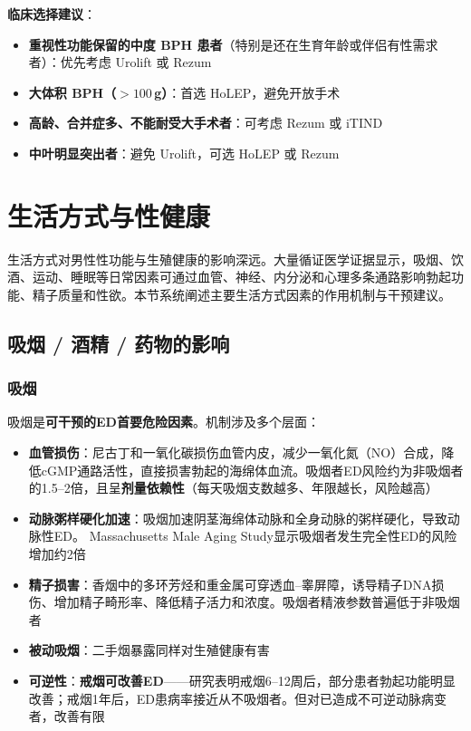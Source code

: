 \noindent\textbf{临床选择建议}：
\begin{itemize}[leftmargin=2cm]
	\item \textbf{重视性功能保留的中度 BPH 患者}（特别是还在生育年龄或伴侣有性需求者）：优先考虑 Urolift 或 Rezum
	\item \textbf{大体积 BPH（$>100$\,g）}：首选 HoLEP，避免开放手术
	\item \textbf{高龄、合并症多、不能耐受大手术者}：可考虑 Rezum 或 iTIND
	\item \textbf{中叶明显突出者}：避免 Urolift，可选 HoLEP 或 Rezum
\end{itemize}

\section{生活方式与性健康}

生活方式对男性性功能与生殖健康的影响深远。大量循证医学证据显示，吸烟、饮酒、运动、睡眠等日常因素可通过血管、神经、内分泌和心理多条通路影响勃起功能、精子质量和性欲。本节系统阐述主要生活方式因素的作用机制与干预建议。

\subsection{吸烟 / 酒精 / 药物的影响}

\subsubsection{吸烟}

吸烟是\textbf{可干预的ED首要危险因素}。机制涉及多个层面：

\begin{itemize}[leftmargin=2cm]
	\item \textbf{血管损伤}：尼古丁和一氧化碳损伤血管内皮，减少一氧化氮（NO）合成，降低cGMP通路活性，直接损害勃起的海绵体血流。吸烟者ED风险约为非吸烟者的1.5--2倍，且呈\textbf{剂量依赖性}（每天吸烟支数越多、年限越长，风险越高）
	\item \textbf{动脉粥样硬化加速}：吸烟加速阴茎海绵体动脉和全身动脉的粥样硬化，导致动脉性ED。 Massachusetts Male Aging Study显示吸烟者发生完全性ED的风险增加约2倍
	\item \textbf{精子损害}：香烟中的多环芳烃和重金属可穿透血--睾屏障，诱导精子DNA损伤、增加精子畸形率、降低精子活力和浓度。吸烟者精液参数普遍低于非吸烟者
	\item \textbf{被动吸烟}：二手烟暴露同样对生殖健康有害
	\item \textbf{可逆性}：\textbf{戒烟可改善ED}——研究表明戒烟6--12周后，部分患者勃起功能明显改善；戒烟1年后，ED患病率接近从不吸烟者。但对已造成不可逆动脉病变者，改善有限
\end{itemize}

